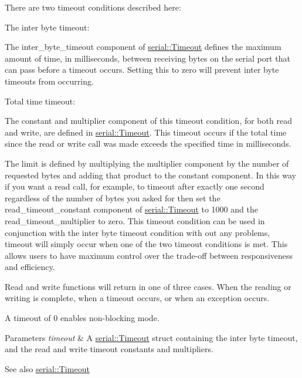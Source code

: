 There are two timeout conditions described here\+:
\begin{DoxyItemize}
\item The inter byte timeout\+:
\begin{DoxyItemize}
\item The inter\+\_\+byte\+\_\+timeout component of \mbox{\hyperlink{structserial_1_1_timeout}{serial\+::\+Timeout}} defines the maximum amount of time, in milliseconds, between receiving bytes on the serial port that can pass before a timeout occurs. Setting this to zero will prevent inter byte timeouts from occurring.
\end{DoxyItemize}
\item Total time timeout\+:
\begin{DoxyItemize}
\item The constant and multiplier component of this timeout condition, for both read and write, are defined in \mbox{\hyperlink{structserial_1_1_timeout}{serial\+::\+Timeout}}. This timeout occurs if the total time since the read or write call was made exceeds the specified time in milliseconds.
\item The limit is defined by multiplying the multiplier component by the number of requested bytes and adding that product to the constant component. In this way if you want a read call, for example, to timeout after exactly one second regardless of the number of bytes you asked for then set the read\+\_\+timeout\+\_\+constant component of \mbox{\hyperlink{structserial_1_1_timeout}{serial\+::\+Timeout}} to 1000 and the read\+\_\+timeout\+\_\+multiplier to zero. This timeout condition can be used in conjunction with the inter byte timeout condition with out any problems, timeout will simply occur when one of the two timeout conditions is met. This allows users to have maximum control over the trade-\/off between responsiveness and efficiency.
\end{DoxyItemize}
\end{DoxyItemize}

Read and write functions will return in one of three cases. When the reading or writing is complete, when a timeout occurs, or when an exception occurs.

A timeout of 0 enables non-\/blocking mode.


\begin{DoxyParams}{Parameters}
{\em timeout} & A \mbox{\hyperlink{structserial_1_1_timeout}{serial\+::\+Timeout}} struct containing the inter byte timeout, and the read and write timeout constants and multipliers.\\
\hline
\end{DoxyParams}
\begin{DoxySeeAlso}{See also}
\mbox{\hyperlink{structserial_1_1_timeout}{serial\+::\+Timeout}} 
\end{DoxySeeAlso}
\mbox{\label{classserial_1_1_serial_a4b4be39af3e1c68bc6ac09cb55788c86}} 
